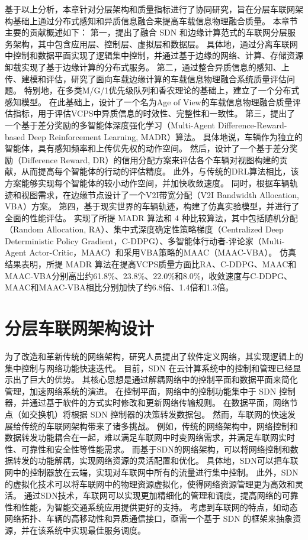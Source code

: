 基于以上分析，本章针对分层架构和质量指标进行了协同研究，旨在分层车联网架构基础上通过分布式感知和异质信息融合来提高车载信息物理融合质量。
本章节主要的贡献概述如下：
第一，提出了融合 SDN 和边缘计算范式的车联网分层服务架构，其中包含应用层、控制层、虚拟层和数据层。
具体地，通过分离车联网中控制和数据平面实现了逻辑集中控制，并通过基于边缘的网络、计算、存储资源卸载实现了基于边缘计算的分布式服务。
第二，通过整合异质信息的感知、上传、建模和评估，研究了面向车载边缘计算的车载信息物理融合系统质量评估问题。
特别地，在多类M/G/1优先级队列和香农理论的基础上，建立了一个分布式感知模型。
在此基础上，设计了一个名为Age of View的车载信息物理融合质量评估指标，用于评估VCPS中异质信息的时效性、完整性和一致性。
第三，提出了一个基于差分奖励的多智能体深度强化学习（Multi-Agent Difference-Reward-based Deep Reinforcement Learning, MADR）算法。
具体地说，车辆作为独立的智能体，具有感知频率和上传优先权的动作空间。
然后，设计了一个基于差分奖励（Difference Reward, DR）的信用分配方案来评估各个车辆对视图构建的贡献，从而提高每个智能体的行动的评估精度。
此外，与传统的DRL算法相比，该方案能够实现每个智能体的较小动作空间，并加快收敛速度。
同时，根据车辆轨迹和视图需求，在边缘节点设计了一个V2I带宽分配（V2I Bandwidth Allocation, VBA）方案。
第四，基于现实世界的车辆轨迹，构建了仿真实验模型，并进行了全面的性能评估。
实现了所提 MADR 算法和 4 种比较算法，其中包括随机分配（Random Allocation, RA）、集中式深度确定性策略梯度（Centralized Deep Deterministic Policy Gradient，C-DDPG）\cite{mlika2022deep}、多智能体行动者-评论家（Multi-Agent Actor-Critic，MAAC）\cite{he2021efficient}和采用VBA策略的MAAC（MAAC-VBA）。
仿真结果表明，所提 MADR 算法在提高VCPS质量方面比RA、C-DDPG、MAAC和MAAC-VBA分别高出约61.8\%、23.8\%、22.0\%和8.0\%，收敛速度与C-DDPG、MAAC和MAAC-VBA相比分别加快了约6.8倍、1.4倍和1.3倍。

\section{分层车联网架构设计}\label{section 2-2}

为了改造和革新传统的网络架构，研究人员提出了软件定义网络\cite{wang2020ji}，其实现逻辑上的集中控制与网络功能快速迭代。
目前，SDN 在云计算系统中的控制和管理已经显示出了巨大的优势\cite{jain2013network}。
其核心思想是通过解耦网络中的控制平面和数据平面来简化管理，加速网络系统的演进。
在控制平面，网络中的控制功能集中于 SDN 控制器，并通过基于软件的方式实时修改和更新网络传输规则。
在数据平面，网络节点（如交换机）将根据 SDN 控制器的决策转发数据包。
然而，车联网的快速发展给传统的车联网架构带来了诸多挑战。
例如，传统的网络架构中，网络控制和数据转发功能耦合在一起，难以满足车联网中时变网络需求，并满足车联网实时性、可靠性和安全性等性能需求。
而基于SDN的网络架构，可以将网络控制和数据转发的功能解耦，实现网络资源的灵活配置和优化。
具体地，SDN可以把车联网中的控制器放在云端，实现对车联网中所有的流量进行集中控制。
此外，SDN的虚拟化技术可以将车联网中的物理资源虚拟化，使得网络资源管理更为高效和灵活。
通过SDN技术，车联网可以实现更加精细化的管理和调度，提高网络的可靠性和性能，为智能交通系统应用提供更好的支持。
考虑到车联网的特点，如动态网络拓扑、车辆的高移动性和异质通信接口，亟需一个基于 SDN 的框架来抽象资源，并在该系统中实现最佳服务调度。

